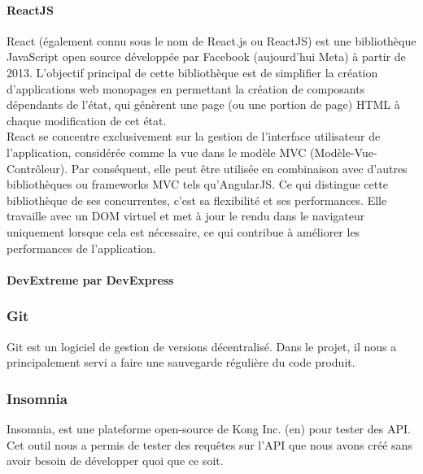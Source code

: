 \documentclass[a4paper, 12pt, french]{article}
\begin{document}
					\paragraph{ReactJS}
	

						React (également connu sous le nom de React.js ou ReactJS) est une bibliothèque JavaScript open source développée par Facebook (aujourd'hui Meta) à partir de 2013. L'objectif principal de cette bibliothèque est de simplifier la création d'applications web monopages en permettant la création de composants dépendants de l'état, qui génèrent une page (ou une portion de page) HTML à chaque modification de cet état.\\

						React se concentre exclusivement sur la gestion de l'interface utilisateur de l'application, considérée comme la vue dans le modèle MVC (Modèle-Vue-Contrôleur). Par conséquent, elle peut être utilisée en combinaison avec d'autres bibliothèques ou frameworks MVC tels qu'AngularJS. Ce qui distingue cette bibliothèque de ses concurrentes, c'est sa flexibilité et ses performances. Elle travaille avec un DOM virtuel et met à jour le rendu dans le navigateur uniquement lorsque cela est nécessaire, ce qui contribue à améliorer les performances de l'application.

					\paragraph{DevExtreme par DevExpress\\}
					

				\subsubsection{Git}%
					Git est un logiciel de gestion de versions décentralisé. Dans le projet, il nous a principalement servi a faire une sauvegarde régulière du code produit.%

				\subsubsection{Insomnia}%
					Insomnia, est une plateforme open-source de Kong Inc. (en) pour tester des API. Cet outil nous a permis de tester des requêtes sur l'API que nous avons créé sans avoir besoin de développer quoi que ce soit.
\end{document}
